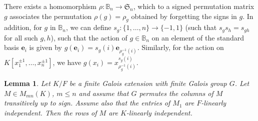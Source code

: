 \documentclass[12pt]{article}
\theoremstyle{plain}
\newtheorem{lemma}[theorem]{Lemma}
\begin{document}
There exists a homomorphism $\rho: \mathbb{B}_n \longrightarrow
\mathfrak{S}_n$, which to a signed permutation matrix $g$ associates
the permutation $\rho(g) = \rho_g$ obtained by forgetting the signs in
$g$. In addition, for $g$ in $\mathbb{B}_n$, we can define $s_g:
\{1,\dots,n\} \to \{-1,1\}$ (such that $s_g s_h =s_{gh}$ for all such
$g,h$), such that the action of $g \in \mathbb{B}_n$ on an element of
the standard basis $\mathbf{e}_i$ is given by $g(\mathbf{e}_i) =
s_g(i) \mathbf{e}_{\rho_g^{-1}(i)}$. Similarly, for the action on
$K[x_1^{\pm 1}, \ldots , x_n^{\pm 1}]$, we have $g(x_i) =
x_{\rho_g^{-1}(i)}^{s_g(i)}.$



\begin{lemma}\label{signdet}
   Let $K/F$ be a finite Galois extension with finite Galois group
   $G$. Let $M \in M_{mn}(K)$, $m \leq n$ and assume that $G$ permutes
   the columns of $M$ transitively up to sign. Assume also that the
   entries of $M_1$ are $F$-linearly independent. Then the rows of $M$
   are $K$-linearly independent.
\end{lemma}
\end{document}
